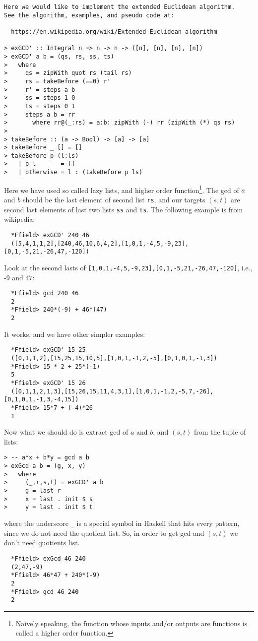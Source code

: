 \documentclass[11pt]{book}
\begin{document}
\label{extendedEuclideanAlgorithm}
\begin{verbatim}
Here we would like to implement the extended Euclidean algorithm.
See the algorithm, examples, and pseudo code at:

  https://en.wikipedia.org/wiki/Extended_Euclidean_algorithm

> exGCD' :: Integral n => n -> n -> ([n], [n], [n], [n])
> exGCD' a b = (qs, rs, ss, ts)
>   where
>     qs = zipWith quot rs (tail rs)
>     rs = takeBefore (==0) r'
>     r' = steps a b
>     ss = steps 1 0
>     ts = steps 0 1
>     steps a b = rr
>       where rr@(_:rs) = a:b: zipWith (-) rr (zipWith (*) qs rs)
>         
> takeBefore :: (a -> Bool) -> [a] -> [a]
> takeBefore _ [] = []
> takeBefore p (l:ls)
>   | p l       = []
>   | otherwise = l : (takeBefore p ls)
\end{verbatim}
Here we have used so called lazy lists, and higher order function\footnote{
Naively speaking, the function whose inputs and/or outputs are functions is called a higher order function.
}.
The gcd of $a$ and $b$ should be the last element of second list \verb+rs+, and our targets $(s,t)$ are second last elements of last two lists \verb+ss+ and \verb+ts+.
The following example is from wikipedia:
\begin{verbatim}
  *Ffield> exGCD' 240 46
  ([5,4,1,1,2],[240,46,10,6,4,2],[1,0,1,-4,5,-9,23],[0,1,-5,21,-26,47,-120])
\end{verbatim}  
Look at the second lasts of \verb+[1,0,1,-4,5,-9,23],[0,1,-5,21,-26,47,-120]+, i.e., -9 and 47:
\begin{verbatim}  
  *Ffield> gcd 240 46
  2
  *Ffield> 240*(-9) + 46*(47)
  2
\end{verbatim}
It works, and we have other simpler examples:
\begin{verbatim}
  *Ffield> exGCD' 15 25
  ([0,1,1,2],[15,25,15,10,5],[1,0,1,-1,2,-5],[0,1,0,1,-1,3])
  *Ffield> 15 * 2 + 25*(-1)
  5
  *Ffield> exGCD' 15 26
  ([0,1,1,2,1,3],[15,26,15,11,4,3,1],[1,0,1,-1,2,-5,7,-26],[0,1,0,1,-1,3,-4,15])
  *Ffield> 15*7 + (-4)*26
  1
\end{verbatim}
Now what we should do is extract gcd of $a$ and $b$, and $(s,t)$ from the tuple of lists:
\begin{verbatim}
> -- a*x + b*y = gcd a b
> exGcd a b = (g, x, y)
>   where
>     (_,r,s,t) = exGCD' a b
>     g = last r
>     x = last . init $ s
>     y = last . init $ t
\end{verbatim}
where the underscore \verb+_+ is a special symbol in Haskell that hits every pattern, since we do not need the quotient list.
So, in order to get gcd and $(s,t)$ we don't need quotients list.
\begin{verbatim}
  *Ffield> exGcd 46 240
  (2,47,-9)
  *Ffield> 46*47 + 240*(-9)
  2
  *Ffield> gcd 46 240
  2
\end{verbatim}
\end{document}
